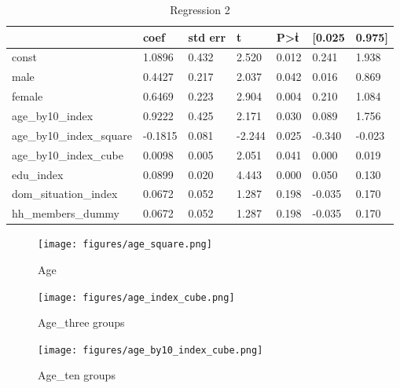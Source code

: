 \documentclass{article}
\begin{document}
\begin{table}[h]
\centering
\caption{Regression 2}
\label{table:age_by10_index_cube}
\begin{tabular}{lllllll}
\hline
                         & coef    & std err & t      & P\textgreater{}\|t\| & {[}0.025 & 0.975{]} \\ \hline
const                    & 1.0896  & 0.432   & 2.520  & 0.012              & 0.241    & 1.938    \\

male                     & 0.4427  & 0.217   & 2.037  & 0.042              & 0.016    & 0.869    \\
female                   & 0.6469  & 0.223   & 2.904  & 0.004              & 0.210    & 1.084    \\

age\_by10\_index         & 0.9222  & 0.425   & 2.171  & 0.030              & 0.089    & 1.756    \\
age\_by10\_index\_square & -0.1815 & 0.081   & -2.244 & 0.025              & -0.340   & -0.023   \\
age\_by10\_index\_cube   & 0.0098  & 0.005   & 2.051  & 0.041              & 0.000    & 0.019    \\
edu\_index               & 0.0899  & 0.020   & 4.443  & 0.000              & 0.050    & 0.130    \\
dom\_situation\_index    & 0.0672  & 0.052   & 1.287  & 0.198              & -0.035   & 0.170    \\
hh\_members\_dummy       & 0.0672  & 0.052   & 1.287  & 0.198              & -0.035   & 0.170    \\
\hline
\end{tabular}
\end{table}




\clearpage

\begin{figure}[h]
\centering
\caption{Age}
\texttt{[image: figures/age\_square.png]}
\label{figure:age_square}
\end{figure}

\begin{figure}[h]
\centering
\caption{Age\_three groups}
\texttt{[image: figures/age\_index\_cube.png]}
\label{figure:age_index_cube}
\end{figure}

\begin{figure}[h]
\centering
\caption{Age\_ten groups}
\texttt{[image: figures/age\_by10\_index\_cube.png]}
\label{figure:age_by10_index_cube}
\end{figure}
\end{document}
